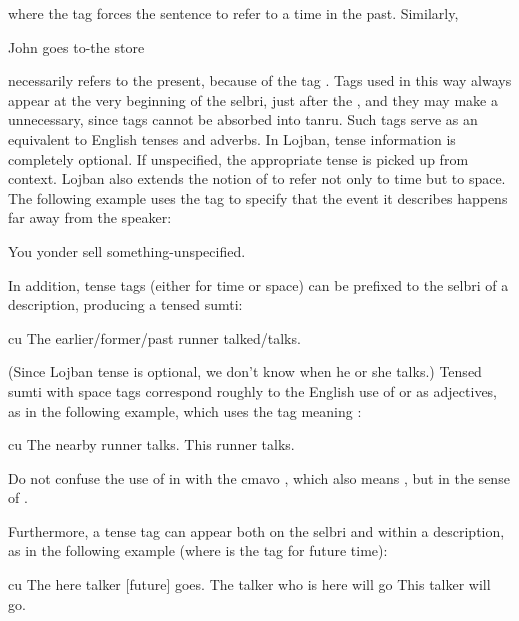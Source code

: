 {\noindent}where the tag  forces the sentence to refer to a time in the past. Similarly,
\begin{example}
  \n
John  goes to-the store
\end{example}

{\noindent}necessarily refers to the present, because of the tag . Tags used in this way always appear at the very beginning of the selbri, just after the , and they may make a  unnecessary, since tags cannot be absorbed into tanru. Such tags serve as an equivalent to English tenses and adverbs. In Lojban, tense information is completely optional. If unspecified, the appropriate tense is picked up from context. Lojban also extends the notion of  to refer not only to time but to space. The following example uses the tag  to specify that the event it describes happens far away from the speaker:
\begin{example}
   \n
You yonder sell something-unspecified.
\end{example}

In addition, tense tags (either for time or space) can be prefixed to the selbri of a description, producing a tensed sumti:
\begin{example}
 cu \n
The earlier/former/past runner talked/talks.
\end{example}

(Since Lojban tense is optional, we don't know when he or she talks.) Tensed sumti with space tags correspond roughly to the English use of  or  as adjectives, as in the following example, which uses the tag  meaning :
\begin{example}
 cu \n
The nearby runner talks.\n
This runner talks.
\end{example}

Do not confuse the use of  in  with the cmavo , which also means , but in the sense of .

Furthermore, a tense tag can appear both on the selbri and within a description, as in the following example (where  is the tag for future time):
\begin{example}
 cu \n
The here talker     [future] goes.\n
The talker who is here will go\n
This talker will go.
\end{example}



